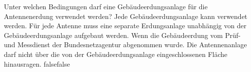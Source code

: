     {Unter welchen Bedingungen darf eine Gebäudeerdungsanlage für die Antennenerdung verwendet werden?}
    {Jede Gebäudeerdungsanlage kann verwendet werden.}
    {Für jede Antenne muss eine separate Erdungsanlage unabhängig von der Gebäudeerdungsanlage aufgebaut werden.}
    {Wenn die Gebäudeerdung vom Prüf- und Messdienst der Bundesnetzagentur abgenommen wurde.}
    {Die Antennenanlage darf nicht über die von der Gebäudeerdungsanlage eingeschlossenen Fläche hinausragen.}
    {false}{false}